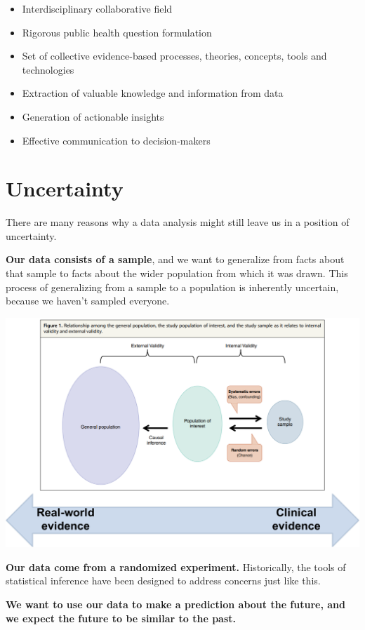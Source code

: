 \documentclass[
  letterpaper,
  DIV=11,
  numbers=noendperiod,
  oneside]{scrreprt}
\providecommand{\tightlist}{%
  \setlength{\itemsep}{0pt}\setlength{\parskip}{0pt}}\usepackage{longtable,booktabs,array}
\begin{document}
\begin{itemize}
\tightlist
\item
  Interdisciplinary collaborative field
\item
  Rigorous public health question formulation
\item
  Set of collective evidence-based processes, theories, concepts, tools
  and technologies
\item
  Extraction of valuable knowledge and information from data
\item
  Generation of actionable insights
\item
  Effective communication to decision-makers
\end{itemize}

\hypertarget{uncertainty}{%
\section{Uncertainty}\label{uncertainty}}

There are many reasons why a data analysis might still leave us in a
position of uncertainty.

\textbf{Our data consists of a sample}, and we want to generalize from
facts about that sample to facts about the wider population from which
it was drawn. This process of generalizing from a sample to a population
is inherently uncertain, because we haven't sampled everyone.

\includegraphics{./images/paste-6D803DF2.png}

\textbf{Our data come from a randomized experiment.} Historically, the
tools of statistical inference have been designed to address concerns
just like this.

\textbf{We want to use our data to make a prediction about the future,
and we expect the future to be similar to the past.}
\end{document}
